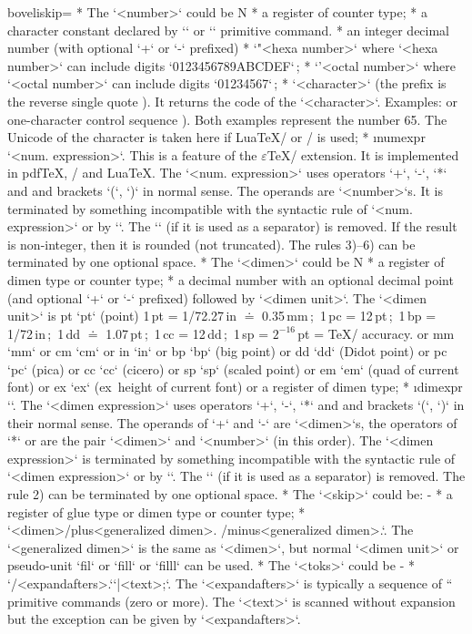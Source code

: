 {\begitems \let\_aboveliskip=\relax 
* The `<number>` could be 
\begitems \style N
* a register of counter type;
* a character constant declared by \x`\chardef` or \x`\mathchardef` primitive command. 
* an integer decimal number (with optional `+` or `-` prefixed)
* {\let\,=\relax `"<hexa number>`} where `<hexa number>` can include digits
  `0123456789ABCDEF`\,;
* {\let\,=\relax`'<octal number>`} where `<octal number>` can include digits 
  `01234567`\,;
* {\let\,=\relax {}`<character>`} (the prefix is the reverse single quote ). 
  It returns the code of the `<character>`. Examples:
   or one-character control sequence ).
  Both examples represent the number 65. The Unicode of the character 
  is taken here if Lua\TeX/ or \XeTeX/ is used;
* \i numexpr `\numexpr<num. expression>`.\fnote
  {This is a feature of the $\varepsilon$\TeX/ extension. It is implemented in pdf\TeX, \XeTeX/ and Lua\TeX.}
  The `<num. expression>` uses operators `+`, `-`, `*` and \code{/} and
  brackets `(`, `)` in normal sense. The operands are `<number>`s. It
  is terminated by something incompatible with
  the syntactic rule of `<num. expression>` or by `\relax`.
  The `\relax` (if it is used as a separator) is removed.
  If the result is non-integer, then it is rounded (not truncated).
\enditems
  The rules 3)--6) can be terminated by one optional space.
* The `<dimen>` could be
\begitems \style N
* a register of dimen type or counter type;
* a decimal number with an optional decimal point (and optional `+` or `-`
  prefixed) followed by `<dimen unit>`. The `<dimen unit>` is \ii pt `pt` (point)\fnote 
  {1\,pt = 1/72.27\,in $\doteq$ 0.35\,mm\,;\ 1\,pc = 12\,pt\,;\
   1\,bp = 1/72\,in\,;\ 1\,dd $\doteq$ 1.07\,pt\,;\ 1\,cc = 12\,dd\,;\
   1\,sp = $2^{-16}$\,pt = \TeX/ accuracy.}
  or \ii mm `mm` or \ii cm `cm` or \ii in `in` or 
  \ii bp `bp` (big point) or \ii dd `dd` (Didot point) or \ii pc `pc` (pica) or 
  \ii cc `cc` (cicero) or \ii sp `sp` (scaled point) or \ii em `em` (quad of current font) or
  \ii ex `ex` (ex~height of current font) or a register of dimen type;  
* \i dimexpr `\dimexpr<dimen expression>`.
  The `<dimen expression>` uses operators `+`, `-`, `*` and \code{/} and
  brackets `(`, `)` in their normal sense. The operands of `+` and `-` are
  `<dimen>`s, the operators of `*` or \code{/} are the pair `<dimen>` and
  `<number>` (in this order). The `<dimen expression>`
  is terminated by something incompatible with the
  syntactic rule of `<dimen expression>` or by `\relax`. The `\relax` (if it
  is used as a separator) is removed.
\enditems
  The rule 2) can be terminated by one optional space.
* The `<skip>` could be:
\begitems \style -
* a register of glue type or dimen type or counter type;
* `<dimen>/plus<generalized dimen>. /minus<generalized dimen>.`. The 
  `<generalized dimen>` is the same as `<dimen>`, but normal `<dimen unit>` 
   or pseudo-unit `fil` or `fill` or `filll` can be used.
\enditems
* The `<toks>` could be
\begitems \style -
* `/<expandafters>.`\z`{|<text>};`. The `<expandafters>` is typically a sequence of
  `\expandafter` primitive commands (zero or more). The \z`<text>` is
  scanned without expansion but the exception can be given by 
  `<expandafters>`.
\enditems
\enditems

}
